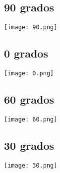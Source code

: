 \documentclass[10pt]{article}
\begin{document}
\subsection{90 grados}
\begin{center}
\texttt{[image: 90.png]}
\end{center}
\subsection{0 grados}
\begin{center}
\texttt{[image: 0.png]}
\end{center}
\subsection{60 grados}
\begin{center}
\texttt{[image: 60.png]}
\end{center}
\subsection{30 grados}
\begin{center}
\texttt{[image: 30.png]}
\end{center}


\end{document}
